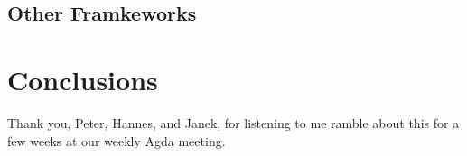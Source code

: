 \documentclass[screen,nonacm]{acmart}
\begin{document}
\citet{10.1145/3293880.3294101}

\subsection{Other Framkeworks}\label{sec:related-frameworks}

\section{Conclusions}\label{sec:conclusions}

\begin{acks}
  Thank you, Peter, Hannes, and Janek, for listening to me ramble about this for a few weeks at our weekly Agda meeting.
\end{acks}



\end{document}
